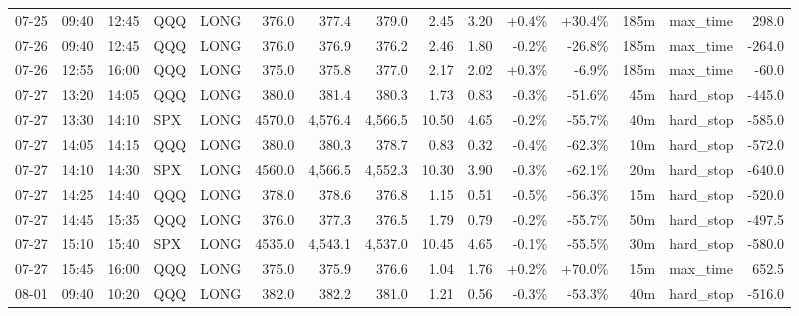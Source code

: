 \documentclass[11pt,a4paper,twoside]{article}
\begin{document}
\begin{landscape}
\begin{center}
\begin{longtable}{>{\color{txtmain}}l l l l l r r r r r r r r >{\color{txtmain}}l r}
07-25 & 09:40 & 12:45 & QQQ & LONG & 376.0 & 377.4 & 379.0 & 2.45 & 3.20 & \textcolor{wingreen}{+0.4\%} & \textcolor{wingreen}{+30.4\%} & 185m & max\_time & \textcolor{wingreen}{298.0} \\
07-26 & 09:40 & 12:45 & QQQ & LONG & 376.0 & 376.9 & 376.2 & 2.46 & 1.80 & \textcolor{lossred}{-0.2\%} & \textcolor{lossred}{-26.8\%} & 185m & max\_time & \textcolor{lossred}{-264.0} \\
07-26 & 12:55 & 16:00 & QQQ & LONG & 375.0 & 375.8 & 377.0 & 2.17 & 2.02 & \textcolor{wingreen}{+0.3\%} & \textcolor{lossred}{-6.9\%} & 185m & max\_time & \textcolor{lossred}{-60.0} \\
07-27 & 13:20 & 14:05 & QQQ & LONG & 380.0 & 381.4 & 380.3 & 1.73 & 0.83 & \textcolor{lossred}{-0.3\%} & \textcolor{lossred}{-51.6\%} & 45m & hard\_stop & \textcolor{lossred}{-445.0} \\
07-27 & 13:30 & 14:10 & SPX & LONG & 4570.0 & 4,576.4 & 4,566.5 & 10.50 & 4.65 & \textcolor{lossred}{-0.2\%} & \textcolor{lossred}{-55.7\%} & 40m & hard\_stop & \textcolor{lossred}{-585.0} \\
07-27 & 14:05 & 14:15 & QQQ & LONG & 380.0 & 380.3 & 378.7 & 0.83 & 0.32 & \textcolor{lossred}{-0.4\%} & \textcolor{lossred}{-62.3\%} & 10m & hard\_stop & \textcolor{lossred}{-572.0} \\
07-27 & 14:10 & 14:30 & SPX & LONG & 4560.0 & 4,566.5 & 4,552.3 & 10.30 & 3.90 & \textcolor{lossred}{-0.3\%} & \textcolor{lossred}{-62.1\%} & 20m & hard\_stop & \textcolor{lossred}{-640.0} \\
07-27 & 14:25 & 14:40 & QQQ & LONG & 378.0 & 378.6 & 376.8 & 1.15 & 0.51 & \textcolor{lossred}{-0.5\%} & \textcolor{lossred}{-56.3\%} & 15m & hard\_stop & \textcolor{lossred}{-520.0} \\
07-27 & 14:45 & 15:35 & QQQ & LONG & 376.0 & 377.3 & 376.5 & 1.79 & 0.79 & \textcolor{lossred}{-0.2\%} & \textcolor{lossred}{-55.7\%} & 50m & hard\_stop & \textcolor{lossred}{-497.5} \\
07-27 & 15:10 & 15:40 & SPX & LONG & 4535.0 & 4,543.1 & 4,537.0 & 10.45 & 4.65 & \textcolor{lossred}{-0.1\%} & \textcolor{lossred}{-55.5\%} & 30m & hard\_stop & \textcolor{lossred}{-580.0} \\
07-27 & 15:45 & 16:00 & QQQ & LONG & 375.0 & 375.9 & 376.6 & 1.04 & 1.76 & \textcolor{wingreen}{+0.2\%} & \textcolor{wingreen}{+70.0\%} & 15m & max\_time & \textcolor{wingreen}{652.5} \\
08-01 & 09:40 & 10:20 & QQQ & LONG & 382.0 & 382.2 & 381.0 & 1.21 & 0.56 & \textcolor{lossred}{-0.3\%} & \textcolor{lossred}{-53.3\%} & 40m & hard\_stop & \textcolor{lossred}{-516.0} \\

\end{longtable}
\end{center}
\end{landscape}
\end{document}
